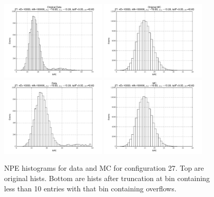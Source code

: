  \begin{figure}[htbp] \begin{center} 
\includegraphics[width=0.45\textwidth]{../FIGURES/27/FIG_Original_Data.pdf} 
\includegraphics[width=0.45\textwidth]{../FIGURES/27/FIG_Original_MC.pdf} 
\includegraphics[width=0.45\textwidth]{../FIGURES/27/FIG_Data.pdf} 
\includegraphics[width=0.45\textwidth]{../FIGURES/27/FIG_MC.pdf} 
\caption{NPE histograms for data and MC for configuration 27. Top are original hists. Bottom are hists after truncation at bin containing less than 10 entries with that bin containing overflows.} 
\label{tab:npe_27} 
\end{center} \end{figure} 

 